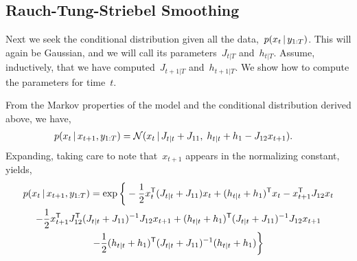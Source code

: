 \documentclass{article}
\begin{document}
\subsection*{Rauch-Tung-Striebel Smoothing}
Next we seek the conditional distribution given all the data,~$p(x_t \,|\, y_{1:T})$. 
This will again be Gaussian, and we will call its parameters~$J_{t|T}$ and~$h_{t|T}$. 
Assume, inductively, that we have computed~$J_{t+1|T}$ and~$h_{t+1|T}$. We show how to 
compute the parameters for time~$t$.

From the Markov properties of the model and the conditional distribution derived above, we have,
\begin{align}
  p(x_t \,|\, x_{t+1}, y_{1:T}) 
  &= \mathcal{N}(x_t \,|\, J_{t|t} + J_{11}, \; h_{t|t} + h_1 - J_{12} x_{t+1}).
\end{align}
Expanding, taking care to note that~$x_{t+1}$ appears in the normalizing constant, yields,
\begin{multline}
  p(x_t \,|\, x_{t+1}, y_{1:T}) 
  = \exp \bigg \{-\frac{1}{2} x_t^{\mathsf{T}} (J_{t|t} + J_{11}) x_t + (h_{t|t} + h_1)^{\mathsf{T}} x_t - x_{t+1}^{\mathsf{T}} J_{12} x_t 
  \\ 
-\frac{1}{2} x_{t+1}^{\mathsf{T}} J_{12}^{\mathsf{T}} (J_{t|t} + J_{11})^{-1} J_{12} x_{t+1} 
+(h_{t|t} + h_1)^{\mathsf{T}} (J_{t|t} + J_{11})^{-1} J_{12} x_{t+1} \\
- \frac{1}{2} (h_{t|t} + h_1)^{\mathsf{T}} (J_{t|t} + J_{11})^{-1} (h_{t|t} + h_1) 
    \bigg \}
\end{multline}
\end{document}
